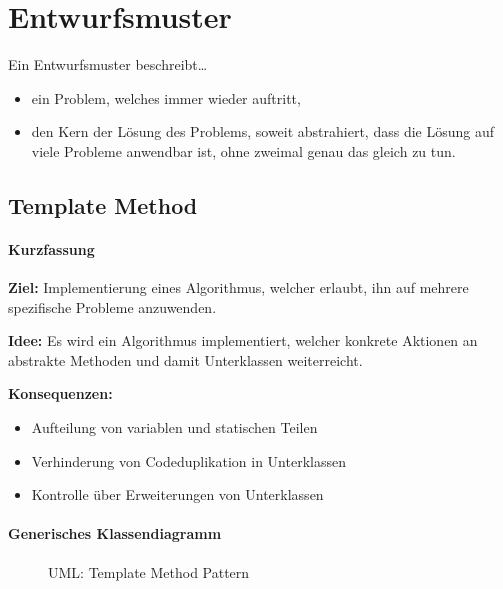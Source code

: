 	\section{Entwurfsmuster}
		Ein Entwurfsmuster beschreibt\dots
		\begin{itemize}
			\item ein Problem, welches immer wieder auftritt,
			\item den Kern der Lösung des Problems, soweit abstrahiert, dass die Lösung auf viele Probleme anwendbar ist, ohne zweimal genau das gleich zu tun.
		\end{itemize}

		\subsection{Template Method}
			\paragraph{Kurzfassung}
				\textbf{Ziel:} Implementierung eines Algorithmus, welcher erlaubt, ihn auf mehrere spezifische Probleme anzuwenden.

				\textbf{Idee:} Es wird ein Algorithmus implementiert, welcher konkrete Aktionen an abstrakte Methoden und damit Unterklassen weiterreicht.

				\textbf{Konsequenzen:}
				\begin{itemize}
					\item Aufteilung von variablen und statischen Teilen
					\item Verhinderung von Codeduplikation in Unterklassen
					\item Kontrolle über Erweiterungen von Unterklassen
				\end{itemize}

			\paragraph{Generisches Klassendiagramm}
				\begin{figure}[ht]
					\centering
					\caption{UML: Template Method Pattern}
				\end{figure}

